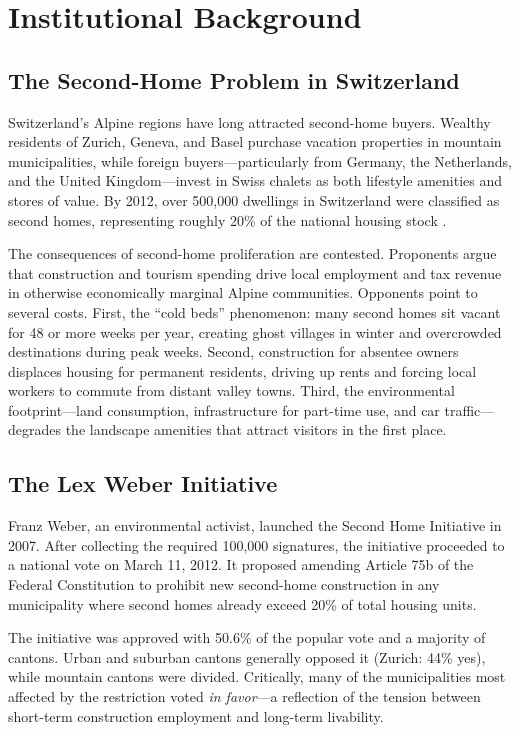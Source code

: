\documentclass[12pt]{article}
\begin{document}
\section{Institutional Background}\label{sec:background}

\subsection{The Second-Home Problem in Switzerland}

Switzerland's Alpine regions have long attracted second-home buyers. Wealthy residents of Zurich, Geneva, and Basel purchase vacation properties in mountain municipalities, while foreign buyers---particularly from Germany, the Netherlands, and the United Kingdom---invest in Swiss chalets as both lifestyle amenities and stores of value. By 2012, over 500,000 dwellings in Switzerland were classified as second homes, representing roughly 20\% of the national housing stock \citep{are2014}.

The consequences of second-home proliferation are contested. Proponents argue that construction and tourism spending drive local employment and tax revenue in otherwise economically marginal Alpine communities. Opponents point to several costs. First, the ``cold beds'' phenomenon: many second homes sit vacant for 48 or more weeks per year, creating ghost villages in winter and overcrowded destinations during peak weeks. Second, construction for absentee owners displaces housing for permanent residents, driving up rents and forcing local workers to commute from distant valley towns. Third, the environmental footprint---land consumption, infrastructure for part-time use, and car traffic---degrades the landscape amenities that attract visitors in the first place.

\subsection{The Lex Weber Initiative}

Franz Weber, an environmental activist, launched the Second Home Initiative in 2007. After collecting the required 100,000 signatures, the initiative proceeded to a national vote on March 11, 2012. It proposed amending Article 75b of the Federal Constitution to prohibit new second-home construction in any municipality where second homes already exceed 20\% of total housing units.

The initiative was approved with 50.6\% of the popular vote and a majority of cantons. Urban and suburban cantons generally opposed it (Zurich: 44\% yes), while mountain cantons were divided. Critically, many of the municipalities most affected by the restriction voted \textit{in favor}---a reflection of the tension between short-term construction employment and long-term livability.
\end{document}
